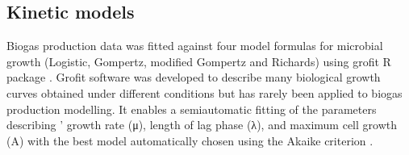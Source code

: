 \subsection{Kinetic models}
Biogas production data was fitted against four model formulas for microbial growth (Logistic, Gompertz, modified Gompertz and Richards) using grofit R package \cite{Kahm_2010}. Grofit software was developed to describe many biological growth curves obtained under different conditions but has rarely been applied to biogas production modelling. It enables a semiautomatic fitting of the parameters describing ’ growth rate (μ), length of lag phase (λ), and maximum cell growth (A) with the best model automatically chosen using the Akaike criterion \cite{Hasenbrink_2006}.